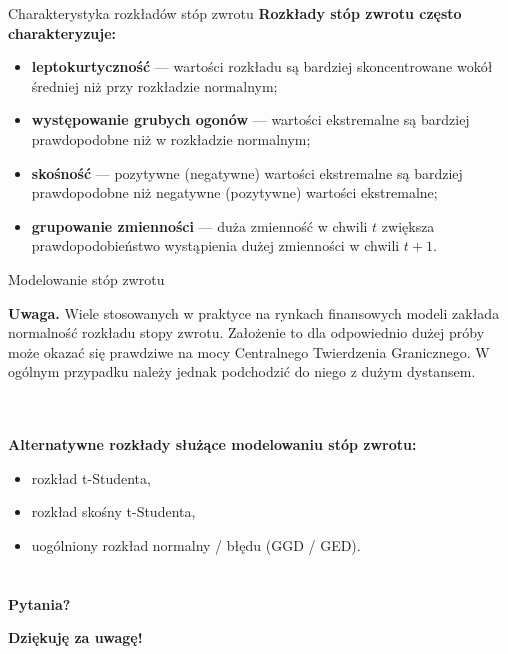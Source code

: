 \documentclass[a4paper, 11pt]{beamer}
\begin{document}
	\begin{frame}{Charakterystyka rozkładów stóp zwrotu}
		\textbf{Rozkłady stóp zwrotu często charakteryzuje:}
		\begin{itemize}
			\item \textbf{leptokurtyczność} --- wartości rozkładu są bardziej skoncentrowane
				wokół średniej niż przy rozkładzie normalnym;
			\item \textbf{występowanie grubych ogonów} --- wartości ekstremalne są bardziej prawdopodobne
				niż w rozkładzie normalnym;
			\item \textbf{skośność} --- pozytywne (negatywne) wartości ekstremalne są bardziej
				prawdopodobne niż negatywne (pozytywne) wartości ekstremalne;
			\item \textbf{grupowanie zmienności} --- duża zmienność w chwili $t$ zwiększa
				prawdopodobieństwo wystąpienia dużej zmienności w chwili $t+1.$
		\end{itemize}
	\end{frame}
	
	\begin{frame}{Modelowanie stóp zwrotu}
		\begin{alert}{\textbf{Uwaga. }}
			Wiele stosowanych w praktyce na rynkach finansowych modeli zakłada normalność rozkładu stopy zwrotu.
			Założenie to dla odpowiednio dużej próby może okazać się prawdziwe na mocy Centralnego Twierdzenia
			Granicznego. W ogólnym przypadku należy jednak podchodzić do niego z dużym dystansem.
		\end{alert}
		\\~\\
		\textbf{Alternatywne rozkłady służące modelowaniu stóp zwrotu:}
		\begin{itemize}
			\item rozkład t-Studenta,
			\item rozkład skośny t-Studenta,
			\item uogólniony rozkład normalny / błędu (GGD / GED).
		\end{itemize}
	\end{frame}

	\section*{}

	\begin{frame}
		\center
		\Huge \bfseries
		Pytania?
	\end{frame}

	\begin{frame}
		\center
		\Huge \bfseries
		Dziękuję za uwagę!
	\end{frame}
\end{document}
